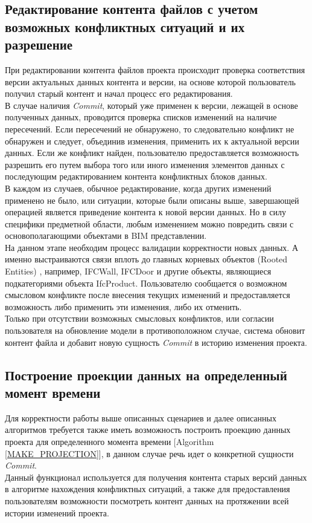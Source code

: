 \documentclass[a4paper,14pt]{extreport} %
\begin{document}
\subsection{Редактирование контента файлов с учетом возможных конфликтных ситуаций и их разрешение}

При редактировании контента файлов проекта происходит проверка соответствия версии актуальных данных контента и версии, на основе которой пользователь получил старый контент и начал процесс его редактирования.  \\
В случае наличия \textit{Commit}, который уже применен к версии, лежащей в основе полученных данных, проводится проверка списков изменений на наличие пересечений. Если пересечений не обнаружено, то следовательно конфликт не обнаружен и следует, объединив изменения, применить их к актуальной версии данных. Если же конфликт найден, пользователю предоставляется возможность разрешить его путем выбора того или иного изменения элементов данных с последующим редактированием контента конфликтных блоков данных. \\
В каждом из случаев, обычное редактирование, когда других изменений применено не было, или ситуации, которые были описаны выше, завершающей операцией является приведение контента к новой версии данных. Но в силу специфики предметной области, любым изменением можно повредить связи с основополагающими объектами в BIM представлении. \\
На данном этапе необходим процесс валидации корректности новых данных. А именно выстраиваются связи вплоть до главных корневых объектов (Rooted Entities) \cite{IFC_MODELS}, например, IFCWall, IFCDoor и другие объекты, являющиеся подкатегориями объекта IfcProduct. Пользователю сообщается о возможном смысловом конфликте после внесения текущих изменений и предоставляется возможность либо применить эти изменения, либо их отменить. \\
Только при отсутствии возможных смысловых конфликтов, или согласии пользователя на обновление модели в противоположном случае, система обновит контент файла и добавит новую сущность \textit{Commit} в историю изменения проекта.

\subsection{Построение проекции данных на определенный момент времени}

Для корректности работы выше описанных сценариев и далее описанных алгоритмов требуется также иметь возможность построить проекцию данных проекта для определенного момента времени [Algorithm \ref{MAKE_PROJECTION}], в данном случае речь идет о конкретной сущности \textit{Commit}. \\
Данный функционал используется для получения контента старых версий данных в алгоритме нахождения конфликтных ситуаций, а также для предоставления пользователям возможности посмотреть контент данных на протяжении всей истории изменений проекта.
\end{document}
